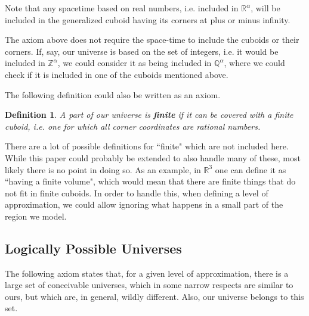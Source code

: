 \documentclass[a4paper
]{article}
\def\reale{\mathbb{R}}
\def\intregi{\mathbb{Z}}
\def\rationale{\mathbb{Q}}
\newcommand{\definitie}[1]{\textbf{#1}}
\newcommand{\ghilimele}[1]{``#1"}
\newtheorem{definition}{Definition}
\begin{document}
Note that any spacetime based on real numbers, i.e. included
in $\reale^\alpha$, will be included in the generalized cuboid having
its corners at plus or minus infinity.

The axiom above does not require the space-time to include the cuboids or
their corners.
If, say, our universe is based on the set of integers, i.e.
it would be included in $\intregi^\alpha$,
we could consider it as being included in $\rationale^\alpha$,
where we could check if it is included in one of the cuboids mentioned
above.

The following definition could also be written as an axiom.

\begin{definition}\label{finitecuboid}
  A part of our universe is \definitie{finite} if
  it can be covered with a finite cuboid, i.e. one
  for which all corner coordinates are rational numbers.
\end{definition}

There are a lot of possible definitions for \ghilimele{finite} which are not
included here.
While this paper could probably be extended to also handle many of these,
most likely there is no point in doing so.
As an example, in $\reale^3$ one can define it as
\ghilimele{having a finite volume}, which would
mean that there are finite things that do not fit in finite cuboids.
In order to handle this, when defining a level of approximation,
we could allow ignoring what happens in a small part of the region we model.

\subsection{Logically Possible Universes}

The following axiom states that, for a given level of approximation,
there is a large set of conceivable universes, which in some narrow respects
are similar to ours, but which are, in general, wildly different.
Also, our universe belongs to this set.
\end{document}
